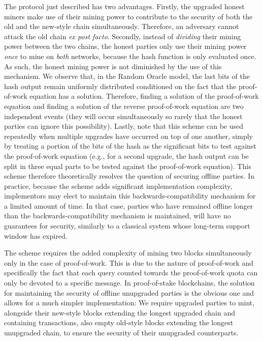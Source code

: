 The protocol just described has two advantages. Firstly, the upgraded honest miners make use of their mining power to contribute to the security
of both the old and the new-style chain simultaneously. Therefore, an adversary cannot attack the old chain \emph{ex post facto}.
Secondly, instead of \emph{dividing} their mining power between the two chains, the honest parties only use their mining power \emph{once} to mine on \emph{both} networks, because the hash function is only evaluated once. As such, the honest mining power is not diminished by the use of this mechanism. We observe that, in the Random Oracle model, the last bits of the hash output remain
uniformly distributed conditioned on the fact that the proof-of-work equation has a solution. Therefore, finding a solution of the
proof-of-work equation and finding a solution of the reverse proof-of-work equation are two independent events (they will occur simultaneously so rarely that the honest parties can ignore this possibility). Lastly, note that this scheme can be used repeatedly
when multiple upgrades have occurred on top of one another, simply by treating a portion of the bits of the hash as the significant
bits to test against the proof-of-work equation (e.g., for a second upgrade, the hash output can be split in three equal parts to be tested against the proof-of-work equation). This scheme therefore theoretically resolves the question of securing offline parties.
In practice, because the scheme adds significant implementation complexity, implementors may elect to maintain this backwards-compatibility
mechanism for a limited amount of time. In that case, parties who have remained offline longer than the backwards-compatibility
mechanism is maintained, will have no guarantees for security, similarly to a classical system whose long-term support window has expired.

The scheme requires the added complexity of mining two blocks simultaneously
only in the case of proof-of-work. This is due to the nature of proof-of-work and specifically the fact that each query counted
towards the proof-of-work quota can only be devoted to a specific message.
In proof-of-stake blockchains, the solution for maintaining the security of offline unupgraded parties is
the obvious one and allows for a much simpler implementation: We require upgraded parties to mint, alongside their
new-style blocks extending the longest upgraded chain and containing transactions,
also empty old-style blocks extending the longest unupgraded chain, to ensure the security of their unupgraded
counterparts.
